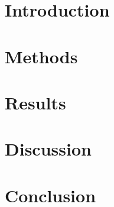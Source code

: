 \documentclass[11pt, a4paper]{scrreprt}
\begin{document}



\tableofcontents

\chapter{Introduction}

\chapter{Methods}
\section{}

\chapter{Results}

\chapter{Discussion}

\chapter{Conclusion}
\end{document}

